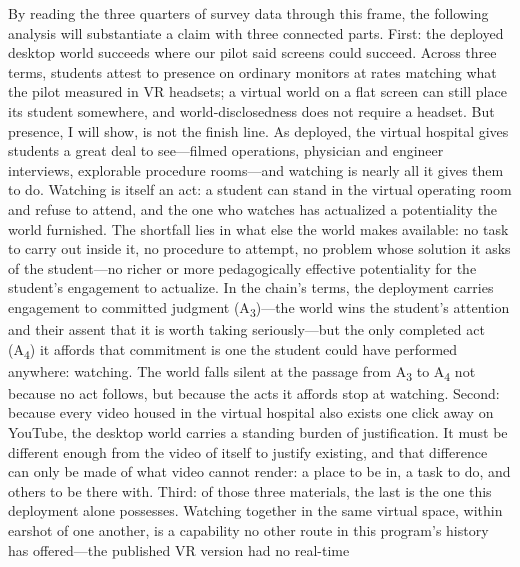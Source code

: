 
By reading the three quarters of survey data through this frame, the following
analysis will substantiate a claim with three connected parts.
First: the deployed desktop world succeeds where our pilot said screens could
succeed. Across three terms, students attest to presence on ordinary monitors at
rates matching what the pilot measured in VR headsets; a virtual world on a flat
screen can still place its student somewhere, and world-disclosedness does not
require a headset. But presence, I will show, is not the finish line. As
deployed, the virtual hospital gives students a great deal to see---filmed
operations, physician and engineer interviews, explorable procedure
rooms---and watching is nearly all it gives them to do. Watching is itself an
act: a student can stand in the virtual operating room and refuse to attend,
and the one who watches has actualized a potentiality the world furnished. The
shortfall lies in what else the world makes available: no task to carry out
inside it, no procedure to attempt, no problem whose solution it asks of the
student---no richer or more pedagogically effective potentiality for the
student's engagement to actualize. In the chain's terms, the deployment
carries engagement to committed judgment (A\textsubscript{3})---the world wins
the student's attention and their assent that it is worth taking
seriously---but the only completed act (A\textsubscript{4}) it affords that
commitment is one the student could have performed anywhere: watching. The
world falls silent at the passage from A\textsubscript{3} to
A\textsubscript{4} not because no act follows, but because the acts it affords
stop at watching. Second:
because every video housed in the virtual hospital also exists one click away on
YouTube, the desktop world carries a standing burden of justification. It must
be different enough from the video of itself to justify existing, and that
difference can only be made of what video cannot render: a place to be in, a
task to do, and others to be there with. Third: of those three materials, the
last is the one this deployment alone possesses. Watching together in the same
virtual space, within earshot of one another, is a capability no other route in
this program's history has offered---the published VR version had no real-time
